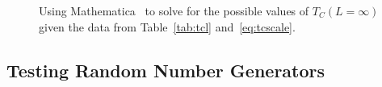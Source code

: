 \documentclass[12pt]{article}
\numberwithin{equation}{section}
\begin{document}
\begin{figure}[h]
\begin{center}
\caption{Using Mathematica~\cite{mathematica} to solve for the possible values of $T_{C}(L=\infty)$ given the data from Table~\ref{tab:tcl} and~\eqref{eq:tcscale}.}
\label{fig:tcsolve}
\end{center}
\end{figure}

\subsection{Testing Random Number Generators}
\label{subsec:randosresults}
\end{document}
